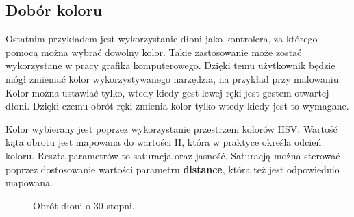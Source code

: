 


\subsection{Dobór koloru}
\quad Ostatnim przykładem jest wykorzystanie dłoni jako kontrolera, za którego pomocą można wybrać dowolny kolor. Takie zastosowanie może zostać wykorzystane w pracy grafika komputerowego. Dzięki temu użytkownik będzie mógł zmieniać kolor wykorzystywanego narzędzia, na przykład przy malowaniu. Kolor można ustawiać tylko, wtedy kiedy gest lewej ręki jest gestem otwartej dłoni. Dzięki czemu obrót ręki zmienia kolor tylko wtedy kiedy jest to wymagane. 

\quad Kolor wybierany jest poprzez wykorzystanie przestrzeni kolorów HSV. Wartość kąta obrotu jest mapowana do wartości H, która w praktyce określa odcień koloru. Reszta parametrów to saturacja oraz jasność. Saturacją można sterować poprzez dostosowanie wartości parametru \textbf{distance}, która też jest odpowiednio mapowana. 

\begin{figure}[H]
    \centering
    \hfill
    \caption{Obrót dłoni o 30 stopni.}
\end{figure}

